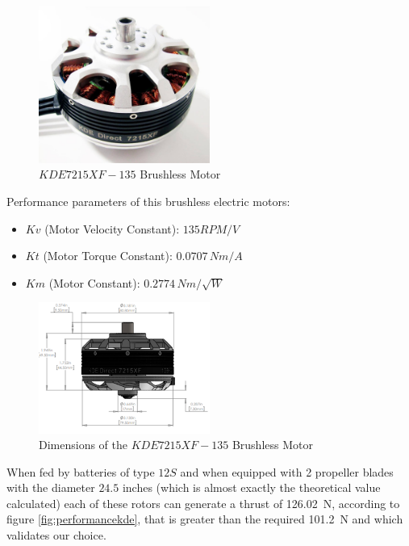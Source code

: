 \documentclass[english,fira]{ist-report}
\begin{document}
\begin{figure}[ht]
    \centering
    \includegraphics[width=0.5\textwidth]{graphics/BrushlessMotorsforVtol/x.jpg}
    \caption{$KDE7215XF-135$ Brushless Motor}
    \label{fig:motorkde}
\end{figure}
\newpage 
Performance parameters of this brushless electric motors:
\begin{itemize}
    \item $Kv$ (Motor Velocity Constant): $135 RPM/V$
    \item $Kt$ (Motor Torque Constant): $0.0707\,Nm/A$
    \item $Km$ (Motor Constant): $0.2774\,Nm/\sqrt{W}$
\end{itemize}

\begin{figure}[ht]
    \centering
    \includegraphics[width=0.5\textwidth]{graphics/BrushlessMotorsforVtol/y.png}
    \caption{Dimensions of the $KDE7215XF-135$ Brushless Motor}
    \label{fig:kdedimensions}
\end{figure}

When fed by batteries of type $12S$ and when equipped with 2 propeller blades with the diameter $24.5$ inches (which is almost exactly the theoretical value calculated) each of these rotors can generate a thrust of \SI{126.02}{\newton}, according to figure \ref{fig:performancekde}, that is greater than the required \SI{101.2}{\newton} and which validates our choice.
\end{document}

